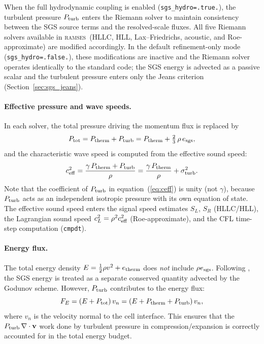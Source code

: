 \documentclass[fleqn,usenatbib]{mnras}
\newcommand{\ramses}{\textsc{ramses}}
\newcommand{\code}[1]{\texttt{#1}}
\begin{document}
When the full hydrodynamic coupling is enabled
(\code{sgs\_hydro=.true.}), the turbulent pressure $P_{\rm turb}$
enters the Riemann solver to maintain consistency between the SGS
source terms and the resolved-scale fluxes.  All five Riemann solvers
available in \ramses\ (HLLC, HLL, Lax--Friedrichs, acoustic, and
Roe-approximate) are modified accordingly.  In the default
refinement-only mode (\code{sgs\_hydro=.false.}), these modifications
are inactive and the Riemann solver operates identically to the
standard code; the SGS energy is advected as a passive scalar and
the turbulent pressure enters only the Jeans criterion
(Section~\ref{sec:sgs_jeans}).

\paragraph{Effective pressure and wave speeds.}
In each solver, the total pressure driving the momentum flux is
replaced by
\begin{equation}
  P_{\rm tot} = P_{\rm therm} + P_{\rm turb}
  = P_{\rm therm} + \tfrac{2}{3}\,\rho\,e_{\rm sgs},
  \label{eq:ptot}
\end{equation}
and the characteristic wave speed is computed from the effective
sound speed:
\begin{equation}
  c_{\rm eff}^2 = \frac{\gamma\,P_{\rm therm} + P_{\rm turb}}{\rho}
  = \frac{\gamma\,P_{\rm therm}}{\rho} + \sigma_{\rm turb}^2.
  \label{eq:ceff}
\end{equation}
Note that the coefficient of $P_{\rm turb}$ in
equation~(\ref{eq:ceff}) is unity (not $\gamma$), because
$P_{\rm turb}$ acts as an independent isotropic pressure with its own
equation of state.  The effective sound speed enters the signal speed
estimates $S_L$, $S_R$ (HLLC/HLL), the Lagrangian sound speed
$c_L^2 = \rho^2 c_{\rm eff}^2$ (Roe-approximate), and the CFL
time-step computation (\code{cmpdt}).

\paragraph{Energy flux.}
The total energy density $E = \frac{1}{2}\rho v^2 + e_{\rm therm}$
does \emph{not} include $\rho e_{\rm sgs}$.  Following
\citet{Schmidt2011}, the SGS energy is treated as a separate
conserved quantity advected by the Godunov scheme.  However,
$P_{\rm turb}$ contributes to the energy flux:
\begin{equation}
  F_E = (E + P_{\rm tot})\,v_n
  = (E + P_{\rm therm} + P_{\rm turb})\,v_n,
  \label{eq:energy_flux}
\end{equation}
where $v_n$ is the velocity normal to the cell interface.  This
ensures that the $P_{\rm turb}\,\nabla\cdot\mathbf{v}$ work done by
turbulent pressure in compression/expansion is correctly accounted
for in the total energy budget.
\end{document}
